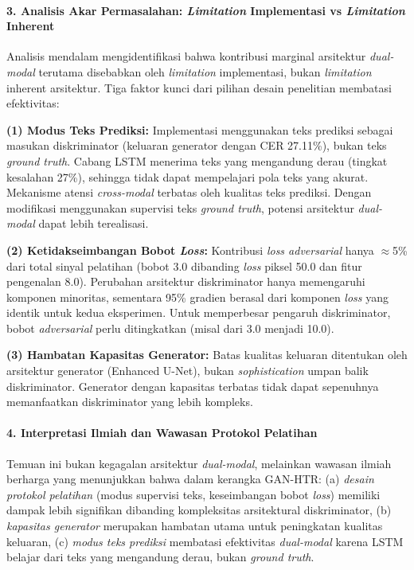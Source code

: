 \documentclass[12pt,a4paper]{article}
\begin{document}
\vspace{0.5em}

\paragraph{3. Analisis Akar Permasalahan: \textit{Limitation} Implementasi vs \textit{Limitation} Inherent}

Analisis mendalam mengidentifikasi bahwa kontribusi marginal arsitektur \textit{dual-modal} terutama disebabkan oleh \textit{limitation} implementasi, bukan \textit{limitation} inherent arsitektur. Tiga faktor kunci dari pilihan desain penelitian membatasi efektivitas:

\textbf{(1) Modus Teks Prediksi:} Implementasi menggunakan teks prediksi sebagai masukan diskriminator (keluaran generator dengan CER 27.11\%), bukan teks \textit{ground truth}. Cabang LSTM menerima teks yang mengandung derau (tingkat kesalahan 27\%), sehingga tidak dapat mempelajari pola teks yang akurat. Mekanisme atensi \textit{cross-modal} terbatas oleh kualitas teks prediksi. Dengan modifikasi menggunakan supervisi teks \textit{ground truth}, potensi arsitektur \textit{dual-modal} dapat lebih terealisasi.

\textbf{(2) Ketidakseimbangan Bobot \textit{Loss}:} Kontribusi \textit{loss adversarial} hanya $\approx$5\% dari total sinyal pelatihan (bobot 3.0 dibanding \textit{loss} piksel 50.0 dan fitur pengenalan 8.0). Perubahan arsitektur diskriminator hanya memengaruhi komponen minoritas, sementara 95\% gradien berasal dari komponen \textit{loss} yang identik untuk kedua eksperimen. Untuk memperbesar pengaruh diskriminator, bobot \textit{adversarial} perlu ditingkatkan (misal dari 3.0 menjadi 10.0).

\textbf{(3) Hambatan Kapasitas Generator:} Batas kualitas keluaran ditentukan oleh arsitektur generator (Enhanced U-Net), bukan \textit{sophistication} umpan balik diskriminator. Generator dengan kapasitas terbatas tidak dapat sepenuhnya memanfaatkan diskriminator yang lebih kompleks.

\vspace{0.5em}

\paragraph{4. Interpretasi Ilmiah dan Wawasan Protokol Pelatihan}

Temuan ini bukan kegagalan arsitektur \textit{dual-modal}, melainkan wawasan ilmiah berharga yang menunjukkan bahwa dalam kerangka GAN-HTR: (a) \textit{desain protokol pelatihan} (modus supervisi teks, keseimbangan bobot \textit{loss}) memiliki dampak lebih signifikan dibanding kompleksitas arsitektural diskriminator, (b) \textit{kapasitas generator} merupakan hambatan utama untuk peningkatan kualitas keluaran, (c) \textit{modus teks prediksi} membatasi efektivitas \textit{dual-modal} karena LSTM belajar dari teks yang mengandung derau, bukan \textit{ground truth}.
\end{document}
